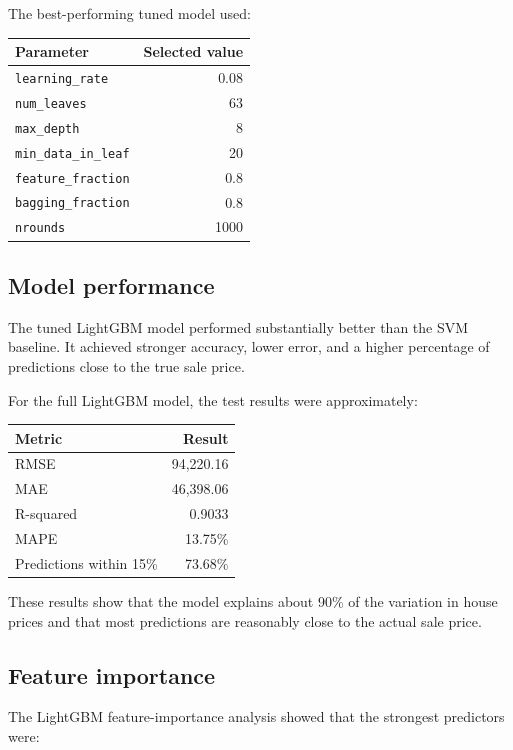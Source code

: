 \documentclass[
  english,
  letterpaper,
  DIV=11,
  numbers=noendperiod]{scrreprt}
\begin{document}
The best-performing tuned model used:

\begin{longtable}[]{@{}lr@{}}
\toprule\noalign{}
Parameter & Selected value \\
\midrule\noalign{}
\endhead
\bottomrule\noalign{}
\endlastfoot
\texttt{learning\_rate} & 0.08 \\
\texttt{num\_leaves} & 63 \\
\texttt{max\_depth} & 8 \\
\texttt{min\_data\_in\_leaf} & 20 \\
\texttt{feature\_fraction} & 0.8 \\
\texttt{bagging\_fraction} & 0.8 \\
\texttt{nrounds} & 1000 \\
\end{longtable}

\subsection{Model performance}\label{model-performance}

The tuned LightGBM model performed substantially better than the SVM
baseline. It achieved stronger accuracy, lower error, and a higher
percentage of predictions close to the true sale price.

For the full LightGBM model, the test results were approximately:

\begin{longtable}[]{@{}lr@{}}
\toprule\noalign{}
Metric & Result \\
\midrule\noalign{}
\endhead
\bottomrule\noalign{}
\endlastfoot
RMSE & 94,220.16 \\
MAE & 46,398.06 \\
R-squared & 0.9033 \\
MAPE & 13.75\% \\
Predictions within 15\% & 73.68\% \\
\end{longtable}

These results show that the model explains about 90\% of the variation
in house prices and that most predictions are reasonably close to the
actual sale price.

\subsection{Feature importance}\label{feature-importance}

The LightGBM feature-importance analysis showed that the strongest
predictors were:
\end{document}
